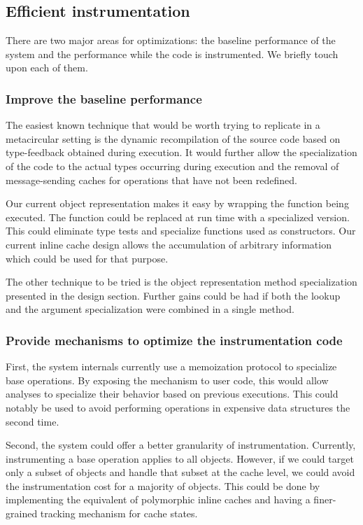 \subsection{Efficient instrumentation}

There are two major areas for optimizations: the baseline performance of the
system and the performance while the code is instrumented. We briefly touch
upon each of them. 

\subsubsection{Improve the baseline performance}

The easiest known technique that would be worth trying to replicate in a
metacircular setting is the dynamic recompilation of the source code based on
type-feedback obtained during execution. It would further allow the
specialization of the code to the actual types occurring during execution and
the removal of message-sending caches for operations that have not been
redefined.

Our current object representation makes it easy by wrapping the function being
executed.  The function could be replaced at run time with a specialized
version. This could eliminate type tests and specialize functions used as
constructors. Our current inline cache design allows the accumulation of
arbitrary information which could be used for that purpose.

The other technique to be tried is the object representation method
specialization presented in the design section. Further gains could be had if
both the lookup and the argument specialization were combined in a single
method.

\subsubsection{Provide mechanisms to optimize the instrumentation code}

First, the system internals currently use a memoization protocol to specialize base
operations. By exposing the mechanism to user code, this would allow analyses to
specialize their behavior based on previous executions. This could notably be
used to avoid performing operations in expensive data structures the second
time.

Second, the system could offer a better granularity of instrumentation.
Currently, instrumenting a base operation applies to all objects. However, if
we could target only a subset of objects and handle that subset at the cache
level, we could avoid the instrumentation cost for a majority of objects. This
could be done by implementing the equivalent of polymorphic inline caches and
having a finer-grained tracking mechanism for cache states.


